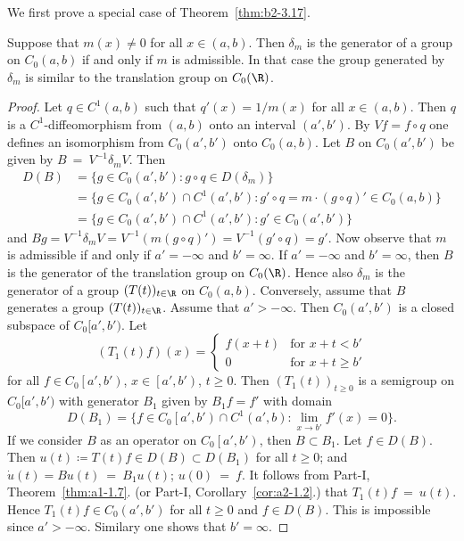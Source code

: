 We first prove a special case of Theorem~\ref{thm:b2-3.17}.
\begin{proposition}\label{prop:b2-3.18}
%
Suppose that $m(x) \neq 0$ for all $x \in (a,b)$.
Then $\delta_{m}$ is the generator of a group on $C_{0}(a,b)$ if and only if\/ $m$ is admissible.
In that case the group generated by $\delta_{m}$ is similar to the translation group on $C_{0}(\R)$.
\end{proposition}
\begin{proof}
Let $q \in C^{1}(a,b)$ such that $q'(x) = 1/m(x)$ for all $x \in (a,b)$.
Then $q$ is a $C^{1}$-diffeomorphism from $(a,b)$ onto an interval $(a',b')$.
By $Vf = f \circ q$ one defines an isomorphism from $C_{0}(a',b')$ onto $C_{0}(a,b)$.
Let $B$ on $C_{0}(a',b')$ be given by $B~=~V^{-1}\delta_{m}V$.
Then 
\begin{align*}
D(B) &= \{ g \in C_{0}(a',b') \colon g \circ q \in D(\delta_{m}) \} \\
&= \{ g \in C_{0}(a',b') \cap C^{1}(a',b') \colon g' \circ q 
= m \cdot (g \circ q)' \in C_{0}(a,b) \} \\
&= \{ g \in C_{0}(a',b') \cap C^{1}(a',b') \colon g' \in C_{0}(a',b') \}
\end{align*}
and $Bg = V^{-1}\delta_{m}V = V^{-1}(m(g \circ q)') = V^{-1}(g' \circ q) = g'$.
Now observe that $m$ is admissible if and only if\/ $a' = -\infty$ and $b' = \infty$.
If\/ $a' = -\infty$ and $b' = \infty$, then $B$ is the generator of the translation group on $C_{0}(\R)$.
Hence also $\delta_{m}$ is the generator of a group $(T(t))_{t \in \R}$ on $C_{0}(a,b)$.
Conversely, assume that $B$ generates a group $(T(t))_{t \in \R}$.
Assume that $a' > -\infty$.
Then $C_{0}(a',b')$ is a closed subspace of\/ $C_{0}[a',b')$.
Let
\begin{equation*}\label{eq:b2-t1}
(T_{1}(t)f)(x) = \begin{cases}
    f(x+t) & \text{for } x+t < b' \\
    0 & \text{for } x+t \geq b'
\end{cases}
\end{equation*}
for all $f \in C_{0}\left[a',b'\right)$, $x \in \left[a',b'\right)$, $t \geq 0$.
Then $(T_{1}(t))_{t \geq 0}$ is a semigroup on $C_{0}[a',b')$ with generator $B_{1}$ given by 
$B_{1}f = f'$ with domain 
\[
D(B_{1}) = \{ f \in C_{0}\left[a',b'\right) \cap C^{1}(a',b) \colon \lim_{x \to b'} f'(x) = 0 \}.
\]
If we consider $B$ as an operator on $C_{0}\left[a',b'\right)$, then $B \subset B_{1}$.
Let $f \in D(B)$.
Then $u(t) \coloneqq T(t)f \in D(B) \subset D(B_{1})$ for all $t \geq 0$; and $\dot{u}(t) = Bu(t)~=~B_{1}u(t)$; $u(0)~=~f$.
It follows from Part-I, Theorem~\ref{thm:a1-1.7}.  (or Part-I, Corollary~\ref{cor:a2-1.2}.)
that $T_{1}(t)f~=~u(t)$.
Hence $T_{1}(t)f \in C_{0}(a',b')$ for all $t \geq 0$ and $f \in D(B)$.
This is impossible since $a' > -\infty$.
Similary one shows that $b' = \infty$.
\end{proof}

